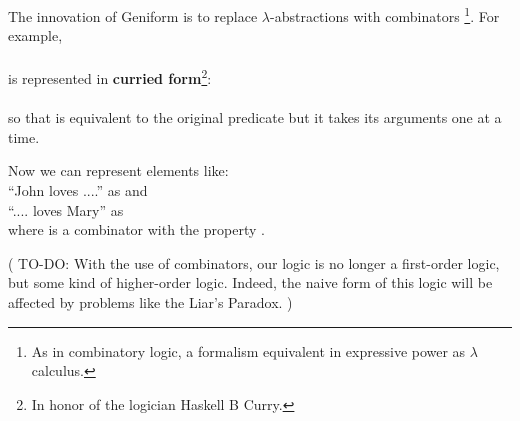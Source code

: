 The innovation of Geniform is to replace $\lambda$-abstractions with combinators \footnote{As in combinatory logic, a formalism equivalent in expressive power as $\lambda$ calculus.}.  For example,\\
\hspace*{1cm} \\
is represented in \textbf{curried form}\footnote{In honor of the logician Haskell B Curry.}:\\
\hspace*{1cm} \\
so that  is equivalent to the original predicate but it takes its arguments one at a time.

Now we can represent elements like:\\
\hspace*{1cm} ``John loves ....'' as  and\\
\hspace*{1cm} ``.... loves Mary'' as \\
where  is a combinator with the property .

( TO-DO:  With the use of combinators, our logic is no longer a first-order logic, but some kind of higher-order logic.  Indeed, the naive form of this logic will be affected by problems like the Liar's Paradox. )

